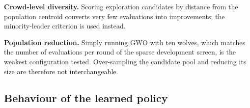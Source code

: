 \textbf{Crowd-level diversity.} Scoring exploration candidates by distance from
the population centroid converts very few evaluations into improvements; the
minority-leader criterion is used instead.

\textbf{Population reduction.} Simply running GWO with ten wolves, which
matches the number of evaluations per round of the sparse development screen, is
the weakest configuration tested. Over-sampling the candidate pool and reducing
its size are therefore not interchangeable.

\subsection{Behaviour of the learned policy}
